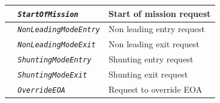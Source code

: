 \documentclass{template/openetcs}
\begin{document}
\begin{itemize}
\begin{longtable}{|l|l|l|}
			\hline
			
			&	\begin{minipage}[t]{0.40\linewidth} \emph{\texttt{StartOfMission}} \end{minipage}
			&	\begin{minipage}[t]{0.38\linewidth} Start of mission request \end{minipage} \\
			
			\hline
			
			&	\begin{minipage}[t]{0.40\linewidth} \emph{\texttt{NonLeadingModeEntry}} \end{minipage}
			&	\begin{minipage}[t]{0.38\linewidth} Non leading entry request \end{minipage} \\
			
			\hline
			
			&	\begin{minipage}[t]{0.40\linewidth} \emph{\texttt{NonLeadingModeExit}} \end{minipage}
			&	\begin{minipage}[t]{0.38\linewidth} Non leading exit request \end{minipage} \\
			
			\hline
			
			&	\begin{minipage}[t]{0.40\linewidth} \emph{\texttt{ShuntingModeEntry}} \end{minipage}
			&	\begin{minipage}[t]{0.38\linewidth} Shunting entry request \end{minipage} \\
			
			\hline
			
			&	\begin{minipage}[t]{0.40\linewidth} \emph{\texttt{ShuntingModeExit}} \end{minipage}
			&	\begin{minipage}[t]{0.38\linewidth}Shunting exit request \end{minipage} \\
			
			\hline
			
			&	\begin{minipage}[t]{0.40\linewidth} \emph{\texttt{OverrideEOA}} \end{minipage}
			&	\begin{minipage}[t]{0.38\linewidth} Request to override EOA \end{minipage} \\
			

\end{longtable}
\end{itemize}
\end{document}

